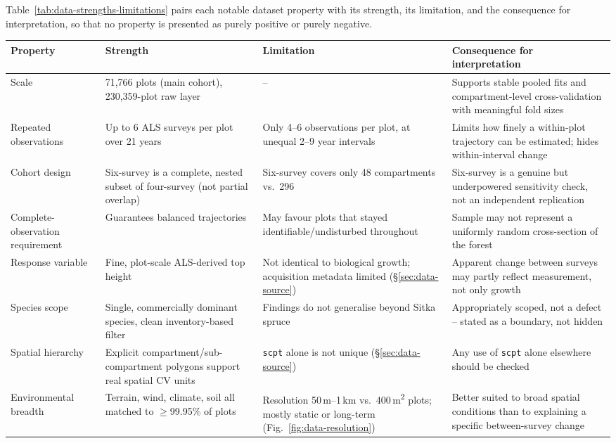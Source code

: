 Table~\ref{tab:data-strengths-limitations} pairs each notable dataset property with its strength,
its limitation, and the consequence for interpretation, so that no property is presented as purely
positive or purely negative.

\begin{table}[!htbp]
\centering
\scriptsize
\setlength{\tabcolsep}{3pt}
\renewcommand{\arraystretch}{1.0}
\begin{tabular}{p{2.4cm}p{4.0cm}p{4.0cm}p{4.4cm}}
\hline
Property & Strength & Limitation & Consequence for interpretation \\
\hline
Scale & 71,766 plots (main cohort), 230,359-plot raw layer & -- & Supports stable pooled fits and compartment-level cross-validation with meaningful fold sizes \\
Repeated observations & Up to 6 ALS surveys per plot over 21 years & Only 4--6 observations per plot, at unequal 2--9 year intervals & Limits how finely a within-plot trajectory can be estimated; hides within-interval change \\
Cohort design & Six-survey is a complete, nested subset of four-survey (not partial overlap) & Six-survey covers only 48 compartments vs.\ 296 & Six-survey is a genuine but underpowered sensitivity check, not an independent replication \\
Complete-observation requirement & Guarantees balanced trajectories & May favour plots that stayed identifiable/undisturbed throughout & Sample may not represent a uniformly random cross-section of the forest \\
Response variable & Fine, plot-scale ALS-derived top height & Not identical to biological growth; acquisition metadata limited (\S\ref{sec:data-source}) & Apparent change between surveys may partly reflect measurement, not only growth \\
Species scope & Single, commercially dominant species, clean inventory-based filter & Findings do not generalise beyond Sitka spruce & Appropriately scoped, not a defect -- stated as a boundary, not hidden \\
Spatial hierarchy & Explicit compartment/sub-compartment polygons support real spatial CV units & \texttt{scpt} alone is not unique (\S\ref{sec:data-source}) & Any use of \texttt{scpt} alone elsewhere should be checked \\
Environmental breadth & Terrain, wind, climate, soil all matched to $\geq$99.95\% of plots & Resolution 50\,m--1\,km vs.\ 400\,m\textsuperscript{2} plots; mostly static or long-term (Fig.~\ref{fig:data-resolution}) & Better suited to broad spatial conditions than to explaining a specific between-survey change \\

\end{tabular}
\end{table}

